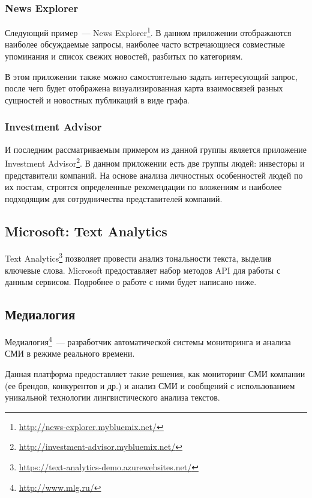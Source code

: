 \subsubsection{News Explorer}

Следующий пример~--- News Explorer\footnote{\url{http://news-explorer.mybluemix.net/}}. В данном приложении отображаются наиболее обсуждаемые запросы, наиболее часто встречающиеся совместные упоминания и список свежих новостей, разбитых по категориям.

В этом приложении также можно самостоятельно задать интересующий запрос, после чего будет отображена визуализированная карта взаимосвязей разных сущностей и новостных публикаций в виде графа.

\subsubsection{Investment Advisor}

И последним рассматриваемым примером из данной группы является приложение Investment Advisor\footnote{\url{http://investment-advisor.mybluemix.net/}}. В данном приложении есть две группы людей: инвесторы и представители компаний. На основе анализа личностных особенностей людей по их постам, строятся определенные рекомендации по вложениям и наиболее подходящим для сотрудничества представителей компаний.

\subsection{Microsoft: Text Analytics}

Text Analytics\footnote{\url{https://text-analytics-demo.azurewebsites.net/}} позволяет провести анализ тональности текста, выделив ключевые слова. Microsoft предоставляет набор методов API для работы с данным сервисом. Подробнее о работе с ними будет написано ниже.

\subsection{Медиалогия}

Медиалогия\footnote{\url{http://www.mlg.ru/}}~--- разработчик автоматической системы мониторинга и анализа СМИ в режиме реального времени.

Данная платформа предоставляет такие решения, как мониторинг СМИ компании (ее брендов, конкурентов и др.) и анализ СМИ и сообщений с использованием уникальной технологии лингвистического анализа текстов.

